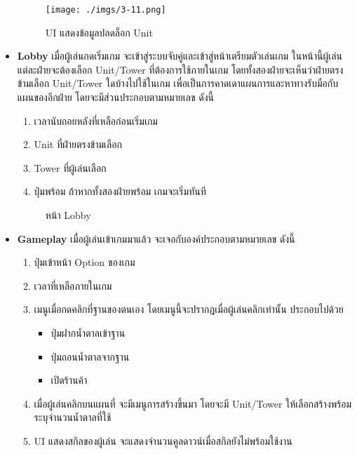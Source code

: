 \documentclass[12pt,oneside,openright,a4paper]{cpe-thai-project}
\begin{document}
\begin{itemize}
  \begin{figure}[H]\centering
    \texttt{[image: ./imgs/3-11.png]}
    \caption{UI แสดงข้อมูลปลดล็อก Unit}\label{fig:3-11}
  \end{figure}


  \item \textbf{Lobby} เมื่อผู้เล่นกดเริ่มเกม จะเข้าสู่ระบบจับคู่และเข้าสู่หน้าเตรียมตัวเล่นเกม 
  ในหน้านี้ผู้เล่นแต่ละฝ่ายจะต้องเลือก Unit/Tower ที่ต้องการใช้ภายในเกม 
  โดยทั้งสองฝ่ายจะเห็นว่าฝ่ายตรงข้ามเลือก Unit/Tower ใดบ้างไปใช้ในเกม 
  เพื่อเป็นการคาดเดาแผนการและหาทางรับมือกับแผนของอีกฝ่าย โดยจะมีส่วนประกอบตามหมายเลข ดังนี้
  \begin{enumerate}
    \item เวลานับถอยหลังที่เหลือก่อนเริ่มเกม
    \item Unit ที่ฝ่ายตรงข้ามเลือก
    \item Tower ที่ผู้เล่นเลือก
    \item ปุ่มพร้อม ถ้าหากทั้งสองฝ่ายพร้อม เกมจะเริ่มทันที
  \end{enumerate}

  \begin{figure}[H]\centering
    \setlength{\fboxsep}{0cm}
    \caption{หน้า Lobby}\label{fig:3-12}
  \end{figure}
  
\pagebreak
  \item \textbf{Gameplay} เมื่อผู้เล่นเข้าเกมมาแล้ว จะเจอกับองค์ประกอบตามหมายเลข ดังนี้
  \begin{enumerate}
    \item ปุ่มเข้าหน้า Option ของเกม
    \item เวลาที่เหลือภายในเกม
    \item เมนูเมื่อกดคลิกที่ฐานของตนเอง โดยเมนูนี้จะปรากฎเมื่อผู้เล่นคลิกเท่านั้น ประกอบไปด้วย
    \begin{itemize}
      \item ปุ่มฝากน้ำตาลเข้าฐาน
      \item ปุ่มถอนน้ำตาลจากฐาน
      \item เปิดร้านค้า
    \end{itemize}
    \item เมื่อผู้เล่นคลิกบนแผนที่ จะมีเมนูการสร้างขึ้นมา 
    โดยจะมี Unit/Tower ให้เลือกสร้างพร้อมระบุจำนวนน้ำตาลที่ใช้
    \item UI แสดงสกิลของผู้เล่น จะแสดงจำนวนคูลดาวน์เมื่อสกิลยังไม่พร้อมใช้งาน
  \end{enumerate}


\end{itemize}
\end{document}
